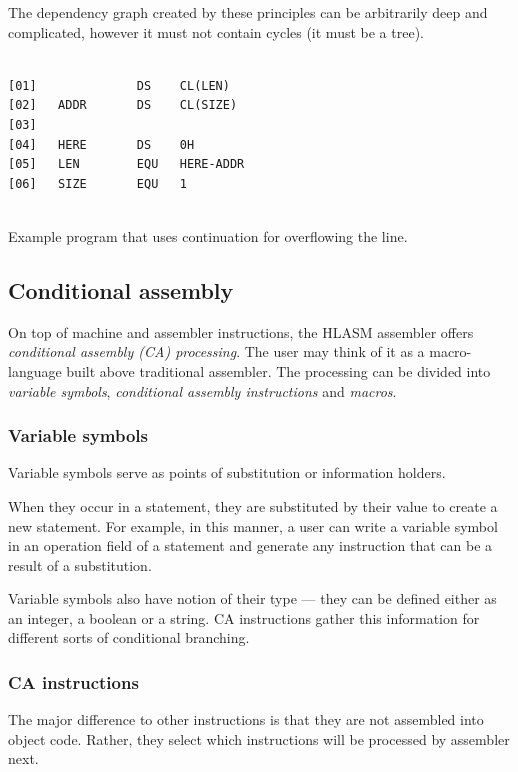 The dependency graph created by these principles can be arbitrarily deep and complicated, however it must not contain cycles (it must be a tree).

\begin{listing}[p]
	\begin{verbatim}
	
[01]              DS    CL(LEN)
[02]   ADDR       DS    CL(SIZE)
[03]
[04]   HERE       DS    0H
[05]   LEN        EQU   HERE-ADDR
[06]   SIZE       EQU   1
	
	\end{verbatim}
	\caption{Example program that uses continuation for overflowing the line.}
	\label{lst:ordinary_assembly}
\end{listing}

\subsection{Conditional assembly}
\label{CA_proc}

On top of machine and assembler instructions, the HLASM assembler offers \emph{conditional assembly (CA) processing}. The user may think of it as a macro-language built above traditional assembler.
The processing can be divided into \emph{variable symbols}, \emph{conditional assembly instructions} and \emph{macros}. 

\subsubsection{Variable symbols}

Variable symbols serve as points of substitution or information holders. 

When they occur in a statement, they are substituted by their value to create a new statement. For example, in this manner, a user can write a variable symbol in an operation field of a statement and generate any instruction that can be a result of a substitution.

Variable symbols also have notion of their type --- they can be defined either as an integer, a boolean or a string. CA instructions gather this information for different sorts of conditional branching.

\subsubsection{CA instructions}

The major difference to other instructions is that they are not assembled into object code. Rather, they select which instructions will be processed by assembler next.

